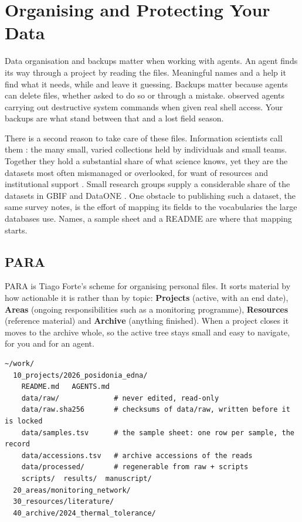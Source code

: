 \chapter{Organising and Protecting Your Data}
\label{ch:organisation}

Data organisation and backups matter when working with agents. An agent finds
its way through a project by reading the files. Meaningful names and a
 help it find what it needs, while  and
 leave it guessing. Backups matter because agents can
delete files, whether asked to do so or through a mistake.
\textcite{shapira2026agentsofchaos} observed agents carrying out destructive
system commands when given real shell access. Your backups are what stand
between that and a lost field season.

There is a second reason to take care of these files. Information scientists
call them : the many small, varied collections held by
individuals and small teams. Together they hold a substantial share of what
science knows, yet they are the datasets most often mismanaged or overlooked,
for want of resources and institutional support
\parencite{stahlman2026longtail}. Small research groups supply a considerable
share of the datasets in GBIF and DataONE \parencite{gadelha2021survey}. One
obstacle to publishing such a dataset, the same survey notes, is the effort of
mapping its fields to the vocabularies the large databases use. Names, a
sample sheet and a README are where that mapping starts.

\section{PARA}

PARA is Tiago Forte's scheme for organising personal files. It sorts material
by how actionable it is rather than by topic:
\textbf{Projects} (active, with an end date), \textbf{Areas} (ongoing
responsibilities such as a monitoring programme), \textbf{Resources} (reference
material) and \textbf{Archive} (anything finished). When a project closes it
moves to the archive whole, so the active tree stays small and easy to navigate,
for you and for an agent.

\begin{lstlisting}[style=shell,caption={A research tree, PARA-shaped}]
~/work/
  10_projects/2026_posidonia_edna/
    README.md   AGENTS.md
    data/raw/             # never edited, read-only
    data/raw.sha256       # checksums of data/raw, written before it is locked
    data/samples.tsv      # the sample sheet: one row per sample, the record
    data/accessions.tsv   # archive accessions of the reads
    data/processed/       # regenerable from raw + scripts
    scripts/  results/  manuscript/
  20_areas/monitoring_network/
  30_resources/literature/
  40_archive/2024_thermal_tolerance/
\end{lstlisting}

